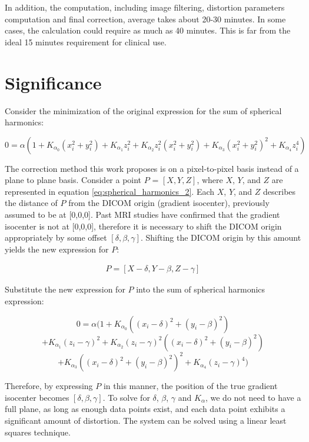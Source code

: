 In addition, the computation, including image filtering, distortion parameters
computation and final correction, average takes about 20-30 minutes.  In some cases, the calculation
could require as much as 40 minutes. This is far from the ideal 15 minutes requirement for clinical use.

\section{Significance}


Consider the minimization of the original expression for the sum of spherical harmonics:

\begin{equation} \label{eq:spherical_harmonics_2}
0 = \alpha(1 + K_{\alpha_0}(x^2_i + y^2_i) + K_{\alpha_1}z^2_i +
K_{\alpha_2}z^2_i(x^2_i + y^2_i) + K_{\alpha_3}(x^2_i + y^2_i)^2 +
K_{\alpha_4}z^4_i)
\end{equation}

The correction method this work proposes is on a pixel-to-pixel basis instead of a plane to plane basis.
Consider a point $P$ = $[X,Y,Z]$, where $X$, $Y$, and $Z$ are represented in equation \ref{eq:spherical_harmonics_2}. Each $X$, $Y$, and $Z$ describes the distance of $P$ from the DICOM origin (gradient isocenter), previously assumed to be at [0,0,0].  Past MRI studies have confirmed that the gradient isocenter is not at [0,0,0], therefore it is necessary to shift the DICOM origin appropriately by some offset $[\delta,\beta,\gamma]$.  Shifting the DICOM origin by this amount yields the new expression for $P$:

\begin{eqnarray}
P = [X - \delta, Y - \beta, Z - \gamma]
\end{eqnarray}

Substitute the new expression for $P$ into the sum of spherical harmonics expression:

$$0 = \alpha(1 + K_{\alpha_0}((x_i - \delta)^2 + (y_i - \beta)^2)$$
$$+ K_{\alpha_1}(z_i - \gamma)^2 + K_{\alpha_2}(z_i - \gamma)^2((x_i - \delta)^2 + (y_i - \beta)^2)$$
$$+ K_{\alpha_3}((x_i - \delta)^2 + (y_i - \beta)^2)^2 + K_{\alpha_4}(z_i - \gamma)^4)$$

Therefore, by expressing $P$ in this manner, the position of the true gradient isocenter becomes
$[\delta, \beta, \gamma]$. To solve for $\delta$, $\beta$, $\gamma$ and $K_{\alpha}$, we do not need
to have a full plane, as long as enough data points exist, and each data point exhibits a significant amount of distortion. The system can be solved using a linear least squares technique.

